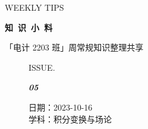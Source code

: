\documentclass[UTF8]{ctexart}
\newcommand\Black[1]{\textcolor[gray]{0.3}{#1}}
\newcommand\Brown[1]{\textcolor[HTML]{998A4E}{#1}}
\newcommand\IssueNumber{05}
\newcommand\Date{2023-10-16}
\newcommand\Subject{积分变换与场论}
\begin{document}
\BgThispage
\begin{center}
{\scriptsize\Issue \textcolor[HTML]{C8BA83}{WEEKLY TIPS}}

{\Huge\bfseries\TitleFont \Black{知\ 识\ 小\ 料}}

\vspace{-0.1cm}
{\footnotesize \Brown{「电计 2203 班」周常规知识整理共享}}
\end{center}

\vspace{-0.5cm}

\begin{figure}[H]
\hspace{1cm}
\begin{minipage}[t]{0.3\textwidth}
\centering
    \Brown{ISSUE.}

    \vspace{-0.6cm}
    \Huge \Issue\slshape\bfseries\Black{\IssueNumber}
\end{minipage}
\hfill
\begin{minipage}[t]{0.3\textwidth}
\centering
    \Brown{日期：\Date} \\
\vspace{-0.1cm}
    \Brown{学科：\Subject} \\
\end{minipage}
\hspace{0.8cm}
\end{figure}
\end{document}

